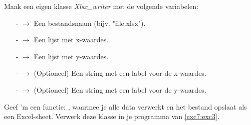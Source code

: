 \begin{exercise}
Maak een eigen klasse \textit{Xlsx\_writer} met de volgende variabelen: 
\begin{itemize}
  \item[-]{   $\rightarrow$ Een bestandsnaam (bijv. "file.xlsx").}
  \item[-]{ $\rightarrow$ Een lijst met x-waardes.}
  \item[-]{ $\rightarrow$ Een lijst met y-waardes.}
  \item[-]{   $\rightarrow$ (Optioneel) Een string met een label voor de x-waardes.}
  \item[-]{   $\rightarrow$ (Optioneel) Een string met een label voor de y-waardes.}
\end{itemize}

Geef 'm een functie: , waarmee je alle data verwerkt en het bestand opslaat als een Excel-sheet. Verwerk deze klasse in je programma van \ref{exc7:exc3}.
\end{exercise}


